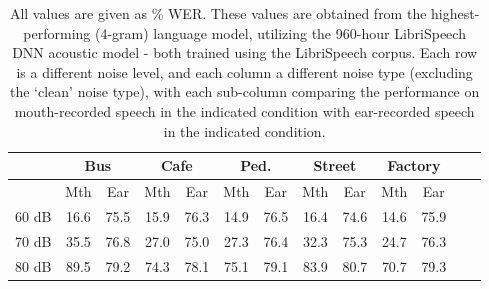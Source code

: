 \begin{table}[h]
\begin{center}
\begin{tabular}{| c || c | c | c | c | c | c | c | c | c | c | c | c |} \hline
      & \multicolumn{2}{|c|}{Bus} & \multicolumn{2}{|c|}{Cafe} & \multicolumn{2}{|c|}{Ped.} & \multicolumn{2}{|c|}{Street} & \multicolumn{2}{|c|}{Factory} \\ \hline
      & Mth & Ear & Mth & Ear & Mth & Ear & Mth & Ear & Mth & Ear \\ \hline\hline
60 dB & 16.6 & 75.5 & 15.9 & 76.3 & 14.9 & 76.5 & 16.4 & 74.6 & 14.6 & 75.9  \\ \hline
70 dB & 35.5 & 76.8 & 27.0 & 75.0 & 27.3 & 76.4 & 32.3 & 75.3 & 24.7 & 76.3  \\ \hline
80 dB & 89.5 & 79.2 & 74.3 & 78.1 & 75.1 & 79.1 & 83.9 & 80.7 & 70.7 & 79.3 \\ \hline
\end{tabular}
\end{center}
\caption{All values are given as \% WER. These values are obtained from the highest-performing (4-gram) language model, utilizing the 960-hour LibriSpeech DNN acoustic model - both trained using the LibriSpeech corpus.  Each row is a different noise level, and each column a different noise type (excluding the `clean' noise type), with each sub-column comparing the performance on mouth-recorded speech in the indicated condition with ear-recorded speech in the indicated condition.}\label{tab:split-wer-noise}
\end{table}

